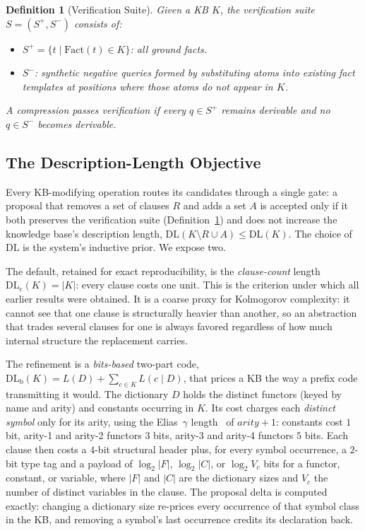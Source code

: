 \documentclass[10pt,conference]{IEEEtran}
\newtheorem{definition}[theorem]{Definition}
\begin{document}
\begin{definition}[Verification Suite]
\label{def:suite}
Given a KB $K$, the verification suite $S = (S^+, S^-)$ consists of:
\begin{itemize}
\item $S^+ = \{t \mid \text{Fact}(t) \in K\}$: all ground facts.
\item $S^-$: synthetic negative queries formed by substituting atoms into existing fact templates at positions where those atoms do not appear in $K$.
\end{itemize}
A compression passes verification if every $q \in S^+$ remains derivable and no $q \in S^-$ becomes derivable.
\end{definition}

\subsection{The Description-Length Objective}
\label{sec:dl}

Every KB-modifying operation routes its candidates through a single gate: a proposal that removes a set of clauses $R$ and adds a set $A$ is accepted only if it both preserves the verification suite (Definition~\ref{def:suite}) and does not increase the knowledge base's description length, $\mathrm{DL}(K \setminus R \cup A) \le \mathrm{DL}(K)$. The choice of $\mathrm{DL}$ is the system's inductive prior. We expose two.

The default, retained for exact reproducibility, is the \emph{clause-count} length $\mathrm{DL}_{\text{c}}(K) = |K|$: every clause costs one unit. This is the criterion under which all earlier results were obtained. It is a coarse proxy for Kolmogorov complexity: it cannot see that one clause is structurally heavier than another, so an abstraction that trades several clauses for one is always favored regardless of how much internal structure the replacement carries.

The refinement is a \emph{bits-based} two-part code, $\mathrm{DL}_{\text{b}}(K) = L(D) + \sum_{c \in K} L(c \mid D)$, that prices a KB the way a prefix code transmitting it would. The dictionary $D$ holds the distinct functors (keyed by name and arity) and constants occurring in $K$. Its cost charges each \emph{distinct symbol} only for its arity, using the Elias~$\gamma$ length~\cite{elias1975universal} of $\mathit{arity}+1$: constants cost $1$ bit, arity-1 and arity-2 functors $3$ bits, arity-3 and arity-4 functors $5$ bits. Each clause then costs a $4$-bit structural header plus, for every symbol occurrence, a $2$-bit type tag and a payload of $\log_2|F|$, $\log_2|C|$, or $\log_2 V_c$ bits for a functor, constant, or variable, where $|F|$ and $|C|$ are the dictionary sizes and $V_c$ the number of distinct variables in the clause. The proposal delta is computed exactly: changing a dictionary size re-prices every occurrence of that symbol class in the KB, and removing a symbol's last occurrence credits its declaration back.
\end{document}
